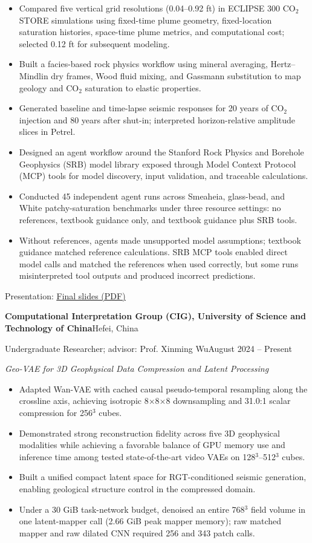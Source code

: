 \documentclass[10pt,letterpaper]{article}
\newcommand{\cvorg}[2]{\textbf{#1}\hfill #2\par}
\newcommand{\cvrole}[2]{#1\hfill #2\par}
\newcommand{\cvproject}[1]{\par\vspace{0.42em}\textit{#1}\par}
\newcommand{\cvlist}[1]{\begin{itemize}#1\end{itemize}}
\newcommand{\cvlink}[2]{\href{#1}{\underline{#2}}}
\begin{document}
\cvlist{
  \item Compared five vertical grid resolutions (0.04--0.92 ft) in ECLIPSE 300 CO$_2$STORE simulations using fixed-time plume geometry, fixed-location saturation histories, space-time plume metrics, and computational cost; selected 0.12 ft for subsequent modeling.
  \item Built a facies-based rock physics workflow using mineral averaging, Hertz--Mindlin dry frames, Wood fluid mixing, and Gassmann substitution to map geology and CO$_2$ saturation to elastic properties.
  \item Generated baseline and time-lapse seismic responses for 20 years of CO$_2$ injection and 80 years after shut-in; interpreted horizon-relative amplitude slices in Petrel.
  \item Designed an agent workflow around the Stanford Rock Physics and Borehole Geophysics (SRB) model library exposed through Model Context Protocol (MCP) tools for model discovery, input validation, and traceable calculations.
  \item Conducted 45 independent agent runs across Smeaheia, glass-bead, and White patchy-saturation benchmarks under three resource settings: no references, textbook guidance only, and textbook guidance plus SRB tools.
  \item Without references, agents made unsupported model assumptions; textbook guidance matched reference calculations. SRB MCP tools enabled direct model calls and matched the references when used correctly, but some runs misinterpreted tool outputs and produced incorrect predictions.
}
Presentation: \cvlink{https://buyudeng.github.io/Final_Presentation.pdf}{Final slides (PDF)}\par\vspace{0.3em}
\cvorg{Computational Interpretation Group (CIG), University of Science and Technology of China}{Hefei, China}
\cvrole{Undergraduate Researcher; advisor: Prof. Xinming Wu}{August 2024 -- Present}
\cvproject{Geo-VAE for 3D Geophysical Data Compression and Latent Processing}
\cvlist{
  \item Adapted Wan-VAE with cached causal pseudo-temporal resampling along the crossline axis, achieving isotropic 8$\times$8$\times$8 downsampling and 31.0:1 scalar compression for 256$^3$ cubes.
  \item Demonstrated strong reconstruction fidelity across five 3D geophysical modalities while achieving a favorable balance of GPU memory use and inference time among tested state-of-the-art video VAEs on 128$^3$--512$^3$ cubes.
  \item Built a unified compact latent space for RGT-conditioned seismic generation, enabling geological structure control in the compressed domain.
  \item Under a 30 GiB task-network budget, denoised an entire 768$^3$ field volume in one latent-mapper call (2.66 GiB peak mapper memory); raw matched mapper and raw dilated CNN required 256 and 343 patch calls.
}
\end{document}
